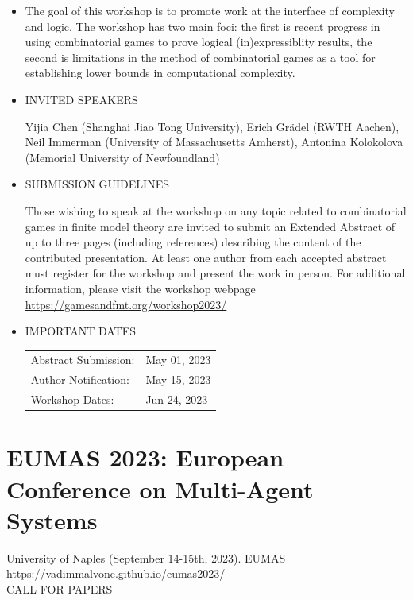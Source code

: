 \documentclass[prodmode,acmtecs]{acmsmall} %
\begin{document}
\begin{itemize}\item  The goal of this workshop is to promote work at the interface of complexity and logic. The workshop has two main foci: the first is recent progress in using combinatorial games to prove logical (in)expressiblity results, the second is limitations in the method of combinatorial games as a tool for establishing lower bounds in computational complexity. 
 
\item  INVITED SPEAKERS 
 
  Yijia Chen (Shanghai Jiao Tong University),  Erich Grädel (RWTH Aachen), Neil Immerman (University of Massachusetts Amherst), Antonina Kolokolova (Memorial University of Newfoundland) 
 
\item  SUBMISSION GUIDELINES 
 
  Those wishing to speak at the workshop on any topic related to combinatorial games in finite model theory are invited to submit an Extended Abstract of up to three pages (including references) describing the content of the contributed presentation. At least one author from each accepted abstract must register for the workshop and present the work in person. For additional information, please visit the workshop webpage \href{https://gamesandfmt.org/workshop2023/}{https://gamesandfmt.org/workshop2023/} 
 
\item  IMPORTANT DATES 
 
\begin{tabulary}{\linewidth}{LL}Abstract Submission:  & May 01, 2023 \\
Author Notification:  & May 15, 2023 \\
Workshop Dates:  & Jun 24, 2023 \\
\end{tabulary}
 
\end{itemize}\section{EUMAS 2023: European Conference on Multi-Agent Systems}\label{EUMAS2023}  University of Naples (September 14-15th, 2023). EUMAS\\ 
  \href{https://vadimmalvone.github.io/eumas2023/}{https://vadimmalvone.github.io/eumas2023/}\\ 
CALL FOR PAPERS 
\end{document}
